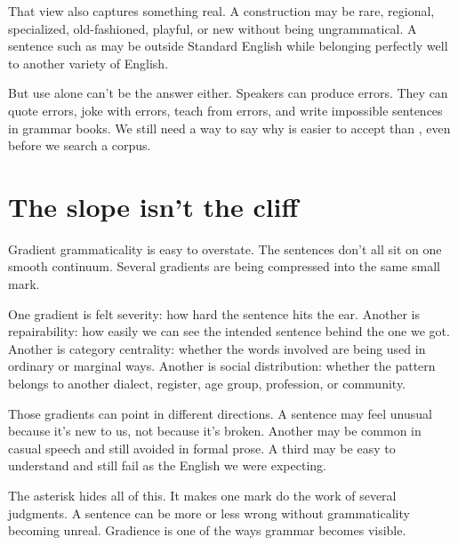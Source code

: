 That view also captures something real. A construction may be rare, regional,
specialized, old-fashioned, playful, or new without being ungrammatical. A
sentence such as  may be outside Standard English while
belonging perfectly well to another variety of English.

But use alone can't be the answer either. Speakers can produce errors. They
can quote errors, joke with errors, teach from errors, and write impossible
sentences in grammar books. We still need a way to say why
 is easier to accept than
, even before we search a corpus.

\section{The slope isn't the cliff}

Gradient grammaticality is easy to overstate. The sentences don't all sit on
one smooth continuum. Several gradients are being compressed into the same
small mark.

One gradient is felt severity: how hard the sentence hits the ear. Another is
repairability: how easily we can see the intended sentence behind the one we
got. Another is category centrality: whether the words involved are being used
in ordinary or marginal ways. Another is social distribution: whether the
pattern belongs to another dialect, register, age group, profession, or
community.

Those gradients can point in different directions. A sentence may feel
unusual because it's new to us, not because it's broken. Another may be
common in casual speech and still avoided in formal prose. A third may be
easy to understand and still fail as the English we were expecting.

The asterisk hides all of this. It makes one mark do the work of several
judgments. A sentence can be more or less wrong without grammaticality
becoming unreal. Gradience is one of the ways grammar becomes visible.
